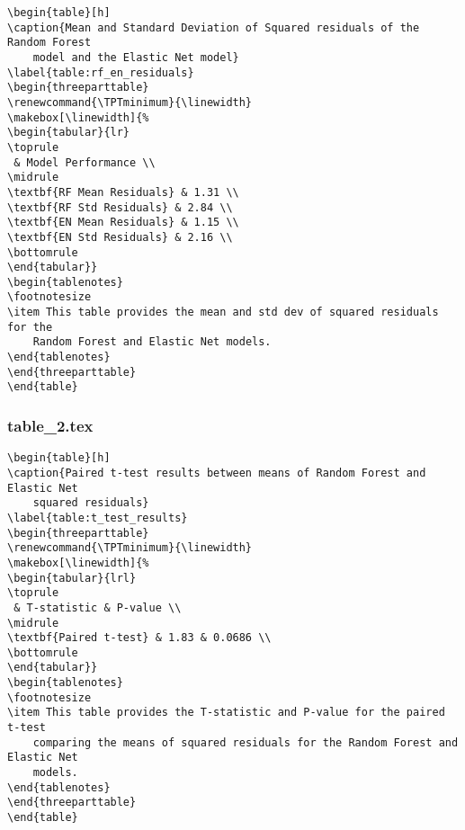 \documentclass[11pt]{article}
\begin{document}
\begin{Verbatim}[tabsize=4]
\begin{table}[h]
\caption{Mean and Standard Deviation of Squared residuals of the Random Forest
	model and the Elastic Net model}
\label{table:rf_en_residuals}
\begin{threeparttable}
\renewcommand{\TPTminimum}{\linewidth}
\makebox[\linewidth]{%
\begin{tabular}{lr}
\toprule
 & Model Performance \\
\midrule
\textbf{RF Mean Residuals} & 1.31 \\
\textbf{RF Std Residuals} & 2.84 \\
\textbf{EN Mean Residuals} & 1.15 \\
\textbf{EN Std Residuals} & 2.16 \\
\bottomrule
\end{tabular}}
\begin{tablenotes}
\footnotesize
\item This table provides the mean and std dev of squared residuals for the
	Random Forest and Elastic Net models.
\end{tablenotes}
\end{threeparttable}
\end{table}

\end{Verbatim}

\subsubsection*{table\_2.tex}

\begin{Verbatim}[tabsize=4]
\begin{table}[h]
\caption{Paired t-test results between means of Random Forest and Elastic Net
	squared residuals}
\label{table:t_test_results}
\begin{threeparttable}
\renewcommand{\TPTminimum}{\linewidth}
\makebox[\linewidth]{%
\begin{tabular}{lrl}
\toprule
 & T-statistic & P-value \\
\midrule
\textbf{Paired t-test} & 1.83 & 0.0686 \\
\bottomrule
\end{tabular}}
\begin{tablenotes}
\footnotesize
\item This table provides the T-statistic and P-value for the paired t-test
	comparing the means of squared residuals for the Random Forest and Elastic Net
	models.
\end{tablenotes}
\end{threeparttable}
\end{table}

\end{Verbatim}
\end{document}
